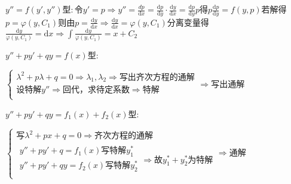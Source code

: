 \begin{spacing}{\hangju}
    $y''=f(y', y'')$型$\colon$令$y' = p \Rightarrow y'' = \frac{\mathrm{}{d}p}{\mathrm{d}x} = \frac{\mathrm{d}p}{\mathrm{d}y} \cdot \frac{\mathrm{d}y}{\mathrm{d}x} = \frac{\mathrm{d}p}{\mathrm{d}y}p$得$p\frac{\mathrm{d}p}{\mathrm{d}y} = f(y, p)$若解得$p = \varphi(y, C_1)$则由$p = \frac{\mathrm{d}y}{\mathrm{d}x} \Rightarrow \frac{\mathrm{d}y}{\mathrm{d}x} = \varphi(y, C_1)$分离变量得$\frac{\mathrm{d}y}{\varphi(y, C_1)} = \mathrm{d}x \Rightarrow \int{\frac{\mathrm{d}y}{\varphi(y, C_1)}} = x + C_2$

    $y'' + py' + qy = f(x)$型$\colon$

    $\left\{
        \begin{array}{l}
            \lambda^2 + p\lambda + q = 0 \Rightarrow \lambda_1, \lambda_2 \Rightarrow \mbox{写出齐次方程的通解}\\
            \mbox{设特解}y'' \Rightarrow \mbox{回代，求待定系数} \Rightarrow \mbox{特解} \\
        \end{array}
    \right.
    \Rightarrow \mbox{写出通解}$

    $y'' + py' + qy = f_1(x) + f_2(x)$型$\colon$

    $\left\{
        \begin{array}{l}
            \mbox{写}\lambda^2 + px + q = 0 \Rightarrow \mbox{齐次方程的通解} \\
            \begin{array}{l}
                y'' + py' + q = f_1(x) \mbox{写特解}y_{1}^{*} \\
                y'' + py' + qy = f_2(x) \mbox{写特解}y_{2}^{*} \\
            \end{array} \Rightarrow \mbox{故}y_{1}^{*} + y_{2}^{*}\mbox{为特解}
        \end{array}
    \right. \Rightarrow \mbox{通解}$
\end{spacing}
